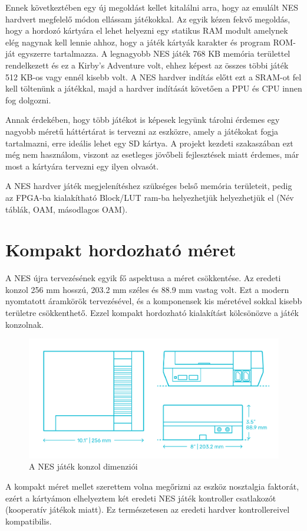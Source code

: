 Ennek következtében egy új megoldást kellet kitalálni arra, hogy az emulált NES hardvert megfelelő módon ellássam játékokkal. Az egyik kézen fekvő megoldás, hogy a hordozó kártyára el lehet helyezni egy statikus RAM modult amelynek elég nagynak kell lennie ahhoz, hogy a játék kártyák karakter és program ROM-ját egyszerre tartalmazza. A legnagyobb NES játék 768 KB memória területtel rendelkezett és ez a Kirby's Adventure volt, ehhez képest az összes többi játék 512 KB-os vagy ennél kisebb volt. A NES hardver indítás előtt ezt a SRAM-ot fel kell töltenünk a játékkal, majd a hardver indítását követően a PPU és CPU innen fog dolgozni.

Annak érdekében, hogy több játékot is képesek legyünk tárolni érdemes egy nagyobb méretű háttértárat is tervezni az eszközre, amely a játékokat fogja tartalmazni, erre ideális lehet egy SD kártya. A projekt kezdeti szakaszában ezt még nem használom, viszont az esetleges jövőbeli fejlesztések miatt érdemes, már most a kártyára tervezni egy ilyen olvasót.

A NES hardver játék megjelenítéshez szükséges belső memória területeit, pedig az FPGA-ba kialakítható Block/LUT ram-ba helyezhetjük helyezhetjük el (Név táblák, OAM, másodlagos OAM).

\section{Kompakt hordozható méret}
\label{sec:Size}

A NES újra tervezésének egyik fő aspektusa a méret csökkentése. Az eredeti konzol 256 mm hosszú, 203.2 mm széles és 88.9 mm vastag volt. Ezt a modern nyomtatott áramkörök tervezésével, és a komponensek kis méretével sokkal kisebb területre csökkenthető. Ezzel kompakt hordozható kialakítást kölcsönözve a játék konzolnak.

\begin{figure}[H]
	\centering
	\includegraphics[width=150mm, keepaspectratio]{figures/NES-size}
	\caption{A NES játék konzol dimenziói}
	\label{fig:NES-size}
\end{figure}

A kompakt méret mellet szerettem volna megőrizni az eszköz nosztalgia faktorát, ezért a kártyámon elhelyeztem két eredeti NES játék kontroller csatlakozót (kooperatív játékok miatt). Ez természetesen az eredeti hardver kontrollereivel kompatibilis.


